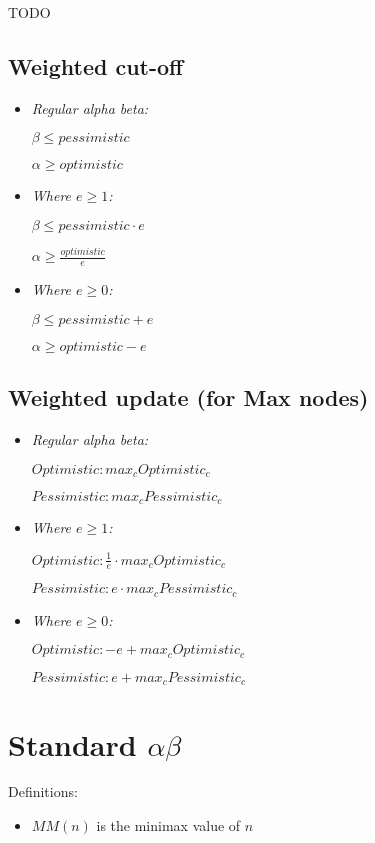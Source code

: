 TODO

\subsection{Weighted cut-off}
\begin{itemize}
  \item \emph{Regular alpha beta:}
  
\setlength\parindent{24pt} $\beta \leq pessimistic$

$\alpha \geq optimistic$

  \item \emph{Where $e\geq 1$:}
  
$\beta \leq pessimistic \cdot  e$

$\alpha \geq \frac{optimistic}{e}$

  \item \emph{Where $e\geq 0$:}
  
$\beta \leq pessimistic+e$

$\alpha \geq optimistic-e$
\end{itemize}

\subsection{Weighted update (for Max nodes)}
\begin{itemize}
  \item \emph{Regular alpha beta:}
  
\setlength\parindent{24pt} $Optimistic: max_c Optimistic_c$

$Pessimistic: max_c Pessimistic_c$

  \item \emph{Where $e\geq 1$:}
  
$Optimistic: \frac{1}{e} \cdot max_c Optimistic_c$

$Pessimistic: e \cdot max_c Pessimistic_c$

  \item \emph{Where $e\geq 0$:}
  
$Optimistic: -e + max_c Optimistic_c$

$Pessimistic: e + max_c Pessimistic_c$
\end{itemize}









\section{Standard $\alpha\beta$}
\noindent Definitions:
\begin{itemize}
\item $MM(n)$ is the minimax value of $n$
\end{itemize}



